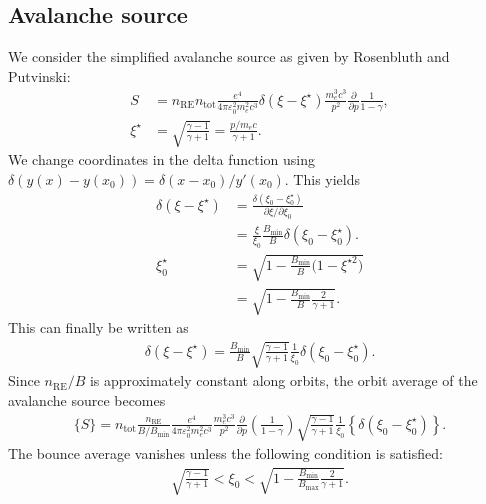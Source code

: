 \documentclass[11pt,a4paper]{article}
\newcommand{\sub}[1]{\ensuremath{_{\text{#1}}}}
\begin{document}
\subsection{Avalanche source}
We consider the simplified avalanche source as given by Rosenbluth and Putvinski:
\begin{align}
S &= n\sub{RE} n\sub{tot} \frac{e^4}{4\pi \varepsilon_0^2 m_e^2 c^3} \delta(\xi-\xi^\star) \frac{m_e^3 c^3}{p^2}\frac{\partial}{\partial p}\frac{1}{1-\gamma}, \\
\xi^\star &= \sqrt{\frac{\gamma-1}{\gamma+1}} = \frac{p/m_e c}{\gamma+1}.
\end{align}
We change coordinates in the delta function using $\delta(y(x) - y(x_0)) = \delta(x-x_0) / y'(x_0)$. This yields
\begin{align}
\delta(\xi - \xi^\star) &= \frac{\delta(\xi_0 - \xi^\star_0)}{\partial \xi/\partial \xi_0} \nonumber \\
&=\frac{\xi}{\xi_0} \frac{B\sub{min}}{B} \delta(\xi_0 - \xi^\star_0).
\\
\xi^\star_0 &= \sqrt{ 1 - \frac{B\sub{min}}{B}\bigl(1-\xi^{\star2}\bigr)} \nonumber \\
&=\sqrt{ 1 - \frac{B\sub{min}}{B}\frac{2}{\gamma+1}}.
\end{align}
This can finally be written as 
\begin{align}
\delta(\xi-\xi^\star) = \frac{B\sub{min}}{B}\sqrt{\frac{\gamma-1}{\gamma+1}} \frac{1}{\xi_0} \delta(\xi_0-\xi_0^\star). 
\end{align}
Since $n\sub{RE}/B$ is approximately constant along orbits, the orbit average of the avalanche source becomes
\begin{align}
\{S\} = n\sub{tot}\frac{n\sub{RE}}{B/B\sub{min}} \frac{e^4}{4\pi\varepsilon_0^2 m_e^2 c^3}  \frac{m_e^3 c^3}{p^2}\frac{\partial}{\partial p}\left(\frac{1}{1-\gamma}\right) \sqrt{\frac{\gamma-1}{\gamma+1}}\frac{1}{\xi_0}\left\{\delta(\xi_0 - \xi^\star_0)\right\}.
\end{align}
The bounce average vanishes unless the following condition is satisfied:
\begin{align}
\sqrt{ \frac{\gamma-1}{\gamma+1}} < \xi_0 <\sqrt{ 1 - \frac{B\sub{min}}{B\sub{max}}\frac{2}{\gamma+1}}.
\end{align}
\end{document}
